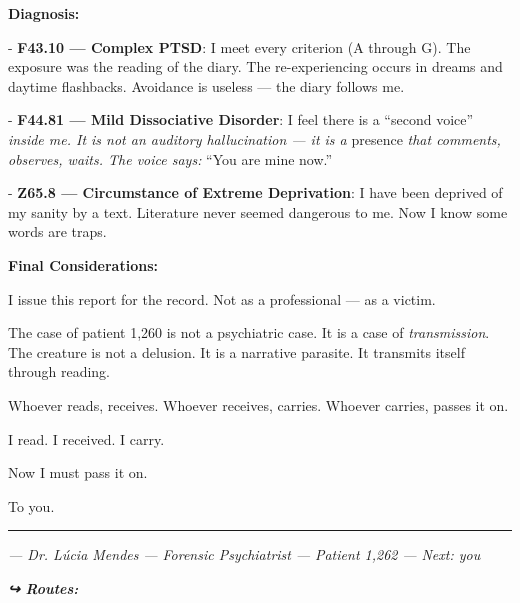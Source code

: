 \noindent \textbf{Diagnosis:}

\noindent - \textbf{F43.10 --- Complex PTSD}: I meet every criterion (A through G). The exposure was the reading of the diary. The re-experiencing occurs in dreams and daytime flashbacks. Avoidance is useless --- the diary follows me.

\noindent - \textbf{F44.81 --- Mild Dissociative Disorder}: I feel there is a \textquotedblleft{}second voice\textquotedblright{\textit{ inside me. It is not an auditory hallucination --- it is a }presence\textit{ that comments, observes, waits. The voice says: }\textquotedblleft{}You are mine now.\textquotedblright{}}

\noindent - \textbf{Z65.8 --- Circumstance of Extreme Deprivation}: I have been deprived of my sanity by a text. Literature never seemed dangerous to me. Now I know some words are traps.

\noindent \textbf{Final Considerations:}

\noindent I issue this report for the record. Not as a professional --- as a victim.

\noindent The case of patient 1,260 is not a psychiatric case. It is a case of \textit{transmission}. The creature is not a delusion. It is a narrative parasite. It transmits itself through reading.

\noindent Whoever reads, receives.
Whoever receives, carries.
Whoever carries, passes it on.

\noindent I read.
I received.
I carry.

\noindent Now I must pass it on.

\noindent To you.

\vspace{0.5em}\noindent\rule{\textwidth}{0.5pt}\vspace{0.5em}

\noindent \textit{--- Dr. Lúcia Mendes}
\textit{--- Forensic Psychiatrist}
\textit{--- Patient 1,262}
\textit{--- Next: you}

\vspace{0.5em}
\noindent\textit{\textbf{↪ Routes:}  \rotasep {}}
